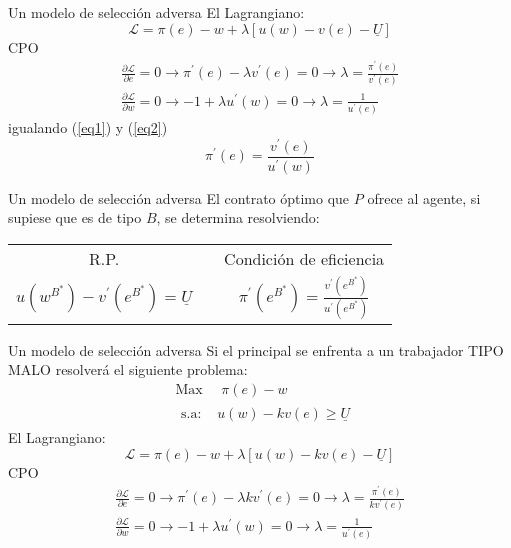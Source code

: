 \begin{frame}{Un modelo de selección adversa}
	El Lagrangiano:
		$$\mathscr{L} = \pi(e) - w + \lambda\left[u(w) - v(e) - \underline{U} \right] $$
	CPO
		\begin{align}
			\frac{\partial \mathscr{L}}{\partial e}= 0 \rightarrow \pi^{\prime}(e) - \lambda v^{\prime}(e) = 0 \rightarrow \lambda = \frac{\pi^{\prime}(e)}{v^{\prime}(e)} \label{eq1}\\
			\frac{\partial \mathscr{L}}{\partial w}= 0 \rightarrow -1+\lambda u^{\prime}(w) = 0 \rightarrow \lambda = \frac{1}{u^{\prime}(e)} \label{eq2}
		\end{align}
	igualando (\ref{eq1}) y (\ref{eq2})
		$$\pi^{\prime}(e) = \frac{v^{\prime}(e)}{u^{\prime}(w)}$$
\end{frame}
\begin{frame}{Un modelo de selección adversa}
	El contrato óptimo que $P$ ofrece al agente, si supiese que es de tipo $B$, se determina resolviendo:
		\begin{center}
			\begin{tabular}{ccc}
				R.P. &{}& Condición de eficiencia\\
				$u(w^{B^{*}}) - v^{\prime}(e^{B^{*}}) = \underline{U}$&{}& $\pi^{\prime}(e^{B^{*}}) =\frac{v^{\prime}(e^{B^{*}})}{u^{\prime}(e^{B^{*}})}$
			\end{tabular}
		\end{center}
\end{frame}
\begin{frame}{Un modelo de selección adversa}
	Si el principal se enfrenta a un trabajador TIPO MALO resolverá el siguiente problema:
		\begin{align*}
			& \text{Max } \quad  \pi(e) - w\\
			& \begin{array}{ll}
				\text{s.a: } & u(w) - kv(e) \geq \underline{U}
			\end{array}
		\end{align*}
	El Lagrangiano:
		$$\mathscr{L} = \pi(e) - w + \lambda\left[u(w) - kv(e) - \underline{U} \right] $$
	CPO
		\begin{align}
			\frac{\partial \mathscr{L}}{\partial e}= 0 \rightarrow \pi^{\prime}(e) - \lambda kv^{\prime}(e) = 0 \rightarrow \lambda = \frac{\pi^{\prime}(e)}{kv^{\prime}(e)} \label{eq3}\\
			\frac{\partial \mathscr{L}}{\partial w}= 0 \rightarrow -1+\lambda u^{\prime}(w) = 0 \rightarrow \lambda = \frac{1}{u^{\prime}(e)} \label{eq4}
		\end{align}
\end{frame}
